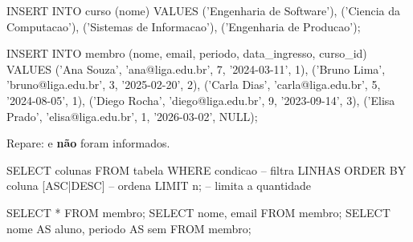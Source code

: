\begin{frame}[fragile]{}
  \vspace{0.2em}
  \begin{sql}
INSERT INTO curso (nome) VALUES
  ('Engenharia de Software'), ('Ciencia da Computacao'),
  ('Sistemas de Informacao'), ('Engenharia de Producao');
  \end{sql}

  \begin{sql}
INSERT INTO membro (nome, email, periodo, data_ingresso, curso_id)
VALUES
  ('Ana Souza',   'ana@liga.edu.br',   7, '2024-03-11', 1),
  ('Bruno Lima',  'bruno@liga.edu.br', 3, '2025-02-20', 2),
  ('Carla Dias',  'carla@liga.edu.br', 5, '2024-08-05', 1),
  ('Diego Rocha', 'diego@liga.edu.br', 9, '2023-09-14', 3),
  ('Elisa Prado', 'elisa@liga.edu.br', 1, '2026-03-02', NULL);
  \end{sql}

  \vspace{0.2em}
  {\small Repare:  e  \textbf{não} foram informados.}

\end{frame}

\begin{frame}[fragile]{}
  \vspace{0.8em}
  \begin{sql}
SELECT   colunas
FROM     tabela
WHERE    condicao          -- filtra LINHAS
ORDER BY coluna [ASC|DESC] -- ordena
LIMIT    n;                -- limita a quantidade
  \end{sql}

  \vspace{1em}
  \begin{sql}
SELECT * FROM membro;
SELECT nome, email FROM membro;
SELECT nome AS aluno, periodo AS sem FROM membro;
  \end{sql}

\end{frame}

